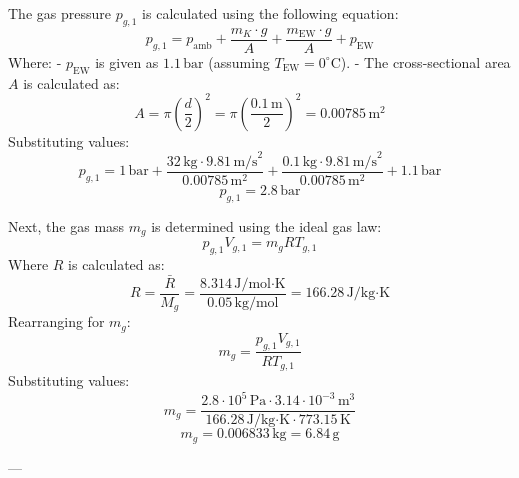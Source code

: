 The gas pressure \( p_{g,1} \) is calculated using the following equation:  
\[
p_{g,1} = p_{\text{amb}} + \frac{m_K \cdot g}{A} + \frac{m_{\text{EW}} \cdot g}{A} + p_{\text{EW}}
\]  
Where:  
- \( p_{\text{EW}} \) is given as \( 1.1 \, \text{bar} \) (assuming \( T_{\text{EW}} = 0^\circ\text{C} \)).  
- The cross-sectional area \( A \) is calculated as:  
\[
A = \pi \left( \frac{d}{2} \right)^2 = \pi \left( \frac{0.1 \, \text{m}}{2} \right)^2 = 0.00785 \, \text{m}^2
\]  
Substituting values:  
\[
p_{g,1} = 1 \, \text{bar} + \frac{32 \, \text{kg} \cdot 9.81 \, \text{m/s}^2}{0.00785 \, \text{m}^2} + \frac{0.1 \, \text{kg} \cdot 9.81 \, \text{m/s}^2}{0.00785 \, \text{m}^2} + 1.1 \, \text{bar}
\]  
\[
p_{g,1} = 2.8 \, \text{bar}
\]  

Next, the gas mass \( m_g \) is determined using the ideal gas law:  
\[
p_{g,1} V_{g,1} = m_g R T_{g,1}
\]  
Where \( R \) is calculated as:  
\[
R = \frac{\bar{R}}{M_g} = \frac{8.314 \, \text{J/mol·K}}{0.05 \, \text{kg/mol}} = 166.28 \, \text{J/kg·K}
\]  
Rearranging for \( m_g \):  
\[
m_g = \frac{p_{g,1} V_{g,1}}{R T_{g,1}}
\]  
Substituting values:  
\[
m_g = \frac{2.8 \cdot 10^5 \, \text{Pa} \cdot 3.14 \cdot 10^{-3} \, \text{m}^3}{166.28 \, \text{J/kg·K} \cdot 773.15 \, \text{K}}
\]  
\[
m_g = 0.006833 \, \text{kg} = 6.84 \, \text{g}
\]  

---